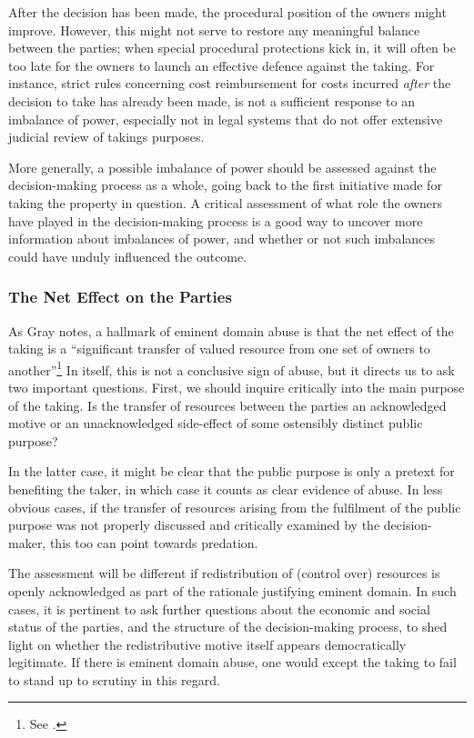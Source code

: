After the decision has been made, the procedural position of the owners might improve. However, this might not serve to restore any meaningful balance between the parties; when special procedural protections kick in, it will often be too late for the owners to launch an effective defence against the taking. For instance, strict rules concerning cost reimbursement for costs incurred {\it after} the decision to take has already been made, is not a sufficient response to an imbalance of power, especially not in legal systems that do not offer extensive judicial review of takings purposes.

More generally, a possible imbalance of power should be assessed against the decision-making process as a whole, going back to the first initiative made for taking the property in question. A critical  assessment of what role the owners have played in the decision-making process is a good way to uncover more information about imbalances of power, and whether or not such imbalances could have unduly influenced the outcome.

\subsubsection*{The Net Effect on the Parties}

As Gray notes, a hallmark of eminent domain abuse is that the net effect of the taking is a ``significant transfer of valued resource from one set of owners to another''\footnote{See \cite[31]{gray11}.} In itself, this is not a conclusive sign of abuse, but it directs us to ask two important questions. First, we should inquire critically into the main purpose of the taking. Is the transfer of resources between the parties an acknowledged motive or an unacknowledged side-effect of some ostensibly distinct public purpose?

In the latter case, it might be clear that the public purpose is only a pretext for benefiting the taker, in which case it counts as clear evidence of abuse. In less obvious cases, if the transfer of resources arising from the fulfilment of the public purpose was not properly discussed and critically examined by the decision-maker, this too can point towards predation.

The assessment will be different if redistribution of (control over) resources is openly acknowledged as part of the rationale justifying eminent domain. In such cases, it is pertinent to ask further  questions about the economic and social status of the parties, and the structure of the decision-making process, to shed light on whether the redistributive motive itself appears democratically legitimate. If there is eminent domain abuse, one would except the taking to fail to stand up to scrutiny in this regard.

